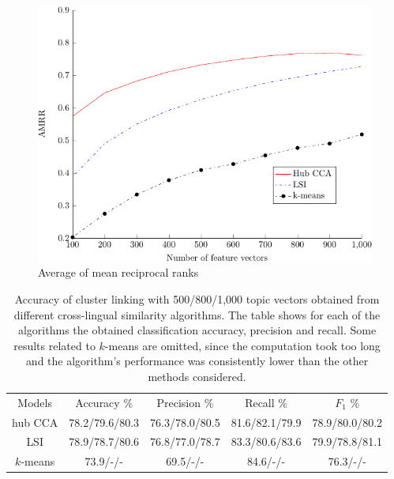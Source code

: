 \begin{figure}
\centering
\includegraphics{figures/retrieval.pdf}
\caption{Average of mean reciprocal ranks}
\label{pic:AMRR}
\end{figure}

\begin{table}[t]
\begin{center}
\begin{tabular}{|c|c|c|c|c|}
  \hline
  \cline{1-5}
  Models & Accuracy \% & Precision \% & Recall \% & $F_1$ \% \\ \cline{1-5}
  hub CCA  & 78.2/79.6/80.3 & 76.3/78.0/80.5  & 81.6/82.1/79.9 & 78.9/80.0/80.2
  \\ \cline{1-5}
  LSI      & 78.9/78.7/80.6  & 76.8/77.0/78.7 & 83.3/80.6/83.6 & 79.9/78.8/81.1  \\ \cline{1-5}
 $k$-means & 73.9/-/- & 69.5/-/- & 84.6/-/- &  76.3/-/- \\ \cline{1-5}
\end{tabular}
\end{center}
\caption{Accuracy of cluster linking with 500/800/1,000 topic vectors obtained from
different cross-lingual similarity algorithms. The table shows for each of the algorithms
the obtained classification accuracy, precision and recall. Some results related to $k$-means
are omitted, since the computation took too long and the algorithm's performance was consistently
lower than the other methods considered.}
\label{table:linkingEvalAlgos}
\end{table}

